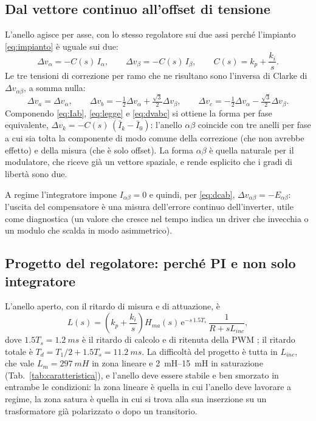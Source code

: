 \documentclass[10pt,a4paper]{scrartcl}
\newcommand{\ee}{\mathrm{e}}
\newcommand{\Ts}{T_s}
\newcommand{\Tuno}{T_1}
\newcommand{\Lm}{L_m}
\newcommand{\Linc}{L_{inc}}
\newcommand{\ab}{\alpha\beta}
\newcommand{\Iab}{I_{\ab}}
\newcommand{\Eab}{E_{\ab}}
\newcommand{\dvab}{\Delta v_{\ab}}
\newcommand{\kp}{k_p}
\newcommand{\ki}{k_i}
\begin{document}
\begin{onehalfspace}
\subsection{Dal vettore continuo all'offset di tensione}
\label{sec:legge}

L'anello agisce per asse, con lo stesso regolatore sui due assi perché l'impianto \eqref{eq:impianto} è uguale sui due:
\begin{equation}
\Delta v_\alpha = -C(s)\,I_\alpha, \qquad \Delta v_\beta = -C(s)\,I_\beta, \qquad C(s) = \kp + \frac{\ki}{s}.
\label{eq:legge}
\end{equation}
Le tre tensioni di correzione per ramo che ne risultano sono l'inversa di Clarke di $\dvab$, a somma nulla:
\begin{equation}
\Delta v_a = \Delta v_\alpha, \qquad \Delta v_b = -\tfrac12\Delta v_\alpha + \tfrac{\sqrt3}{2}\Delta v_\beta, \qquad \Delta v_c = -\tfrac12\Delta v_\alpha - \tfrac{\sqrt3}{2}\Delta v_\beta .
\label{eq:dvabc}
\end{equation}
Componendo \eqref{eq:Iab}, \eqref{eq:legge} e \eqref{eq:dvabc} si ottiene la forma per fase equivalente, $\Delta v_k = -C(s)\,(\bar I_k - \bar I_0)$: l'anello $\alpha\beta$ coincide con tre anelli per fase a cui sia tolta la componente di modo comune della correzione (che non avrebbe effetto) e della misura (che è solo offset). La forma $\alpha\beta$ è quella naturale per il modulatore, che riceve già un vettore spaziale, e rende esplicito che i gradi di libertà sono due.

A regime l'integratore impone $\Iab = 0$ e quindi, per \eqref{eq:dcab}, $\dvab = -\Eab$: l'uscita del compensatore è una misura dell'errore continuo dell'inverter, utile come diagnostica (un valore che cresce nel tempo indica un driver che invecchia o un modulo che scalda in modo asimmetrico).

\subsection{Progetto del regolatore: perché PI e non solo integratore}
\label{sec:progetto}

L'anello aperto, con il ritardo di misura e di attuazione, è
\begin{equation}
L(s) = \left(\kp + \frac{\ki}{s}\right) H_{ma}(s)\,\ee^{-s\,1.5\Ts}\,\frac{1}{R + s\Linc},
\label{eq:anello}
\end{equation}
dove $1.5\Ts = \SI{1.2}{ms}$ è il ritardo di calcolo e di ritenuta della PWM \cite{buso2015}; il ritardo totale è $T_d = \Tuno/2 + 1.5\Ts = \SI{11.2}{ms}$. La difficoltà del progetto è tutta in $\Linc$, che vale $\Lm = \SI{297}{mH}$ in zona lineare e \SIrange{2}{15}{mH} in saturazione (Tab.~\ref{tab:caratteristica}), e l'anello deve essere stabile e ben smorzato in entrambe le condizioni: la zona lineare è quella in cui l'anello deve lavorare a regime, la zona satura è quella in cui si trova alla sua inserzione su un trasformatore già polarizzato o dopo un transitorio.


\end{onehalfspace}
\end{document}
